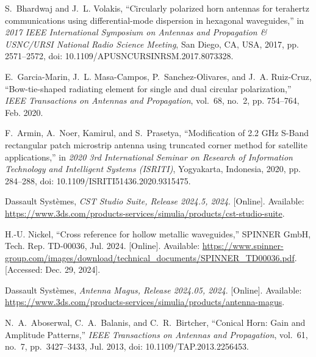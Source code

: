 \documentclass[journal]{IEEEtran}
\begin{document}
\begin{thebibliography}{99}
    S.~Bhardwaj and J.~L. Volakis, ``Circularly polarized horn antennas for terahertz communications using differential-mode dispersion in hexagonal waveguides,'' in \emph{2017 IEEE International Symposium on Antennas and Propagation \& USNC/URSI National Radio Science Meeting}, San Diego, CA, USA, 2017, pp. 2571--2572, doi: 10.1109/APUSNCURSINRSM.2017.8073328.

    E.~Garcia-Marin, J.~L. Masa-Campos, P.~Sanchez-Olivares, and J.~A. Ruiz-Cruz, ``Bow-tie-shaped radiating element for single and dual circular polarization,'' \emph{IEEE Transactions on Antennas and Propagation}, vol.~68, no.~2, pp. 754--764, Feb. 2020.

    F.~Armin, A.~Noer, Kamirul, and S.~Prasetya, ``Modification of 2.2 GHz S-Band rectangular patch microstrip antenna using truncated corner method for satellite applications,'' in \emph{2020 3rd International Seminar on Research of Information Technology and Intelligent Systems (ISRITI)}, Yogyakarta, Indonesia, 2020, pp. 284--288, doi: 10.1109/ISRITI51436.2020.9315475.

    Dassault Syst{\`e}mes, \emph{CST Studio Suite, Release 2024.5, 2024}. [Online]. Available: \url{https://www.3ds.com/products-services/simulia/products/cst-studio-suite}.

    H.-U. Nickel, ``Cross reference for hollow metallic waveguides,'' SPINNER GmbH, Tech. Rep. TD-00036, Jul. 2024. [Online]. Available: \url{https://www.spinner-group.com/images/download/technical_documents/SPINNER_TD00036.pdf}. [Accessed: Dec. 29, 2024].

    Dassault Syst{\`e}mes, \emph{Antenna Magus, Release 2024.05, 2024}. [Online]. Available: \url{https://www.3ds.com/products-services/simulia/products/antenna-magus}.

    N.~A.~Aboserwal, C.~A.~Balanis, and C.~R.~Birtcher, ``Conical Horn: Gain and Amplitude Patterns,'' \emph{IEEE Transactions on Antennas and Propagation}, vol.~61, no.~7, pp.~3427--3433, Jul. 2013, doi: 10.1109/TAP.2013.2256453.


\end{thebibliography}
\end{document}
